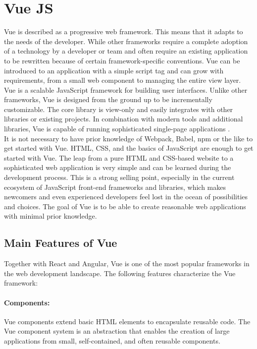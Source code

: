 \newpage
	\section{Vue JS}
	\label{Grundlagen:Vue}
	Vue is described as a progressive web framework. This means that it adapts to the needs of the developer. While other frameworks require a complete adoption of a technology by a developer or team and often require an existing application to be rewritten because of certain framework-specific conventions. Vue can be introduced to an application with a simple script tag and can grow with requirements, from a small web component to managing the entire view layer. Vue is a scalable JavaScript framework for building user interfaces. Unlike other frameworks, Vue is designed from the ground up to be incrementally customizable. The core library is view-only and easily integrates with other libraries or existing projects. In combination with modern tools and additional libraries, Vue is capable of running sophisticated single-page applications \cite{Vue019:Intro:Online}.\\

	It is not necessary to have prior knowledge of Webpack, Babel, npm or the like to get started with Vue. HTML, CSS, and the basics of JavaScript are enough to get started with Vue.
	The leap from a pure HTML and CSS-based website to a sophisticated web application is very simple and can be learned during the development process. This is a strong selling point, especially in the current ecosystem of JavaScript front-end frameworks and libraries, which makes newcomers and even experienced developers feel lost in the ocean of possibilities and choices. The goal of Vue is to be able to create reasonable web applications with minimal prior knowledge.
	
	\subsection{Main Features of Vue}
	\label{Grundlagen:VueFeatures}
	Together with React and Angular, Vue is one of the most popular frameworks in the web development landscape. The following features characterize the Vue framework:


	
	\paragraph*{Components:} Vue components extend basic \gls{HTML} elements to encapsulate reusable code. The Vue component system is an abstraction that enables the creation of large applications from small, self-contained, and often reusable components.
